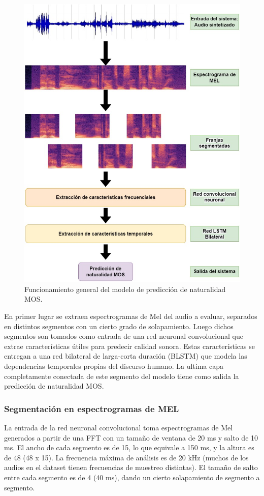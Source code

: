 \begin{figure}[h]
    \centering
    \includegraphics[scale=.45]{imagenes/funcionamiento_general.jpg}
    \caption{ Funcionamiento general del modelo de predicción de naturalidad MOS.}
    \label{fig:fgeneral}
\end{figure}

En primer lugar se extraen espectrogramas de Mel del audio a evaluar, separados en distintos segmentos con un cierto grado de solapamiento. Luego dichos segmentos son tomados como entrada de una red neuronal convolucional que extrae características útiles para predecir calidad sonora. Estas características se entregan a una red bilateral de larga-corta duración (BLSTM) que modela las dependencias temporales propias del discurso humano. La ultima capa completamente conectada de este segmento del modelo tiene como salida la predicción de naturalidad MOS.

\subsubsection{Segmentación en espectrogramas de MEL}
La entrada de la red neuronal convolucional toma espectrogramas de Mel generados a partir de una FFT con un tamaño de ventana de 20 ms y salto de 10 ms. El ancho de cada segmento es de 15, lo que equivale a 150 ms, y la altura es de 48 (48 x 15). La frecuencia máxima de análisis es de 20 kHz (muchos de los audios en el dataset tienen frecuencias de muestreo distintas). El tamaño de salto entre cada segmento es de 4 (40 ms), dando un cierto solapamiento de segmento a segmento. 

